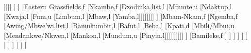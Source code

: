 \documentclass[landscape]{standalone}
\begin{document}
\begin{forest}
											[Isu,u
											[Laimbie,u
											[Weh,u
											[Zhoa,u]]]]]
										]%
									]%
									[Eastern Grassfields,f
										[Nkambe,f
											[Dzodinka,list,l
											[Mfumte,u
											[Ndaktup,l
											[Kwaja,l
											[Fum,u
											[Limbum,l
											[Mbaw,l
											[Yamba,l]]]]]]]]
										]%
										[Mbam-Nkam,f
											[Ngemba,f
												[Awing/Mbwe'wi,list,l
												[Bamukumbit,l
												[Bafut,l
												[Beba,l
												[Kpati,d
												[Mbili/Mbui,u
												[Mendankwe/Nkwen,l
												[Mankon,l
												[Mundum,u
												[Pinyin,l]]]]]]]]]]
											]%
											[Bamileke,f
											]%
										]%
									]%
								]%
							]%
						]%
					]%
				]%
			]%
		]%
	]%
]%
\end{forest}
\end{document}
